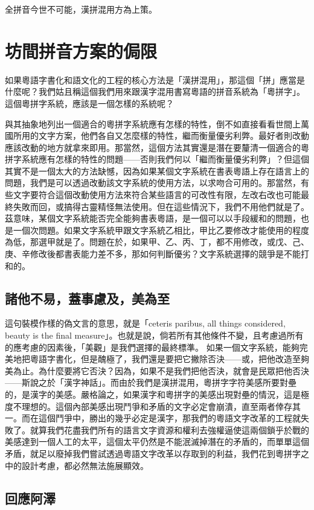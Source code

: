\documentclass[a5paper, 12pt, openany]{book} %
\begin{document}
全拼音今世不可能，漢拼混用方為上策。
 
\chapter{坊間拼音方案的侷限}

如果粵語字書化和語文化的工程的核心方法是「漢拼混用」，那這個「拼」應當是什麼呢？我們姑且稱這個我們用來跟漢字混用書寫粵語的拼音系統為「粵拼字」。這個粵拼字系統，應該是一個怎樣的系統呢？

與其抽象地列出一個適合的粵拼字系統應有怎樣的特性，倒不如直接看看世間上萬國所用的文字方案，他們各自又怎麼樣的特性，繼而衡量優劣利弊。最好者則改動應該改動的地方就拿來即用。那當然，這個方法其實還是潛在要釐清一個適合的粵拼字系統應有怎樣的特性的問題——否則我們何以「繼而衡量優劣利弊」？但這個其實不是一個太大的方法缺憾，因為如果某個文字系統在書表粵語上存在語言上的問題，我們是可以透過改動該文字系統的使用方法，以求吻合可用的。那當然，有些文字要符合這個改動使用方法來符合某些語言的可改性有限，左改右改也可能最終失敗而回，或搞得古靈精怪無法使用。但在這些情況下，我們不用他們就是了。茲意味，某個文字系統能否完全能夠書表粵語，是一個可以以手段緩和的問題，也是一個次問題。如果文字系統甲跟文字系統乙相比，甲比乙要修改才能使用的程度為低，那選甲就是了。問題在於，如果甲、乙、丙、丁，都不用修改，或戊、己、庚、辛修改後都書表能力差不多，那如何判斷優劣？文字系統選擇的競爭是不能打和的。

\section{諸他不易，蓋事慮及，美為至}

這句裝模作樣的偽文言的意思，就是「ceteris paribus, all things considered, beauty is the final measure」。也就是說，倘若所有其他條件不變，且考慮過所有的應考慮的因素後，「美觀」是我們選擇的最終標準。  如果一個文字系統，能夠完美地把粵語字書化，但是醜極了，我們還是要把它撇除否決——或，把他改造至夠美為止。為什麼要將它否決？因為，如果不是我們把他否決，就會是民眾把他否決——斯說之於「漢字神話」。而由於我們是漢拼混用，粵拼字字符美感所要對壘的，是漢字的美感。嚴格論之，如果漢字和粵拼字的美感出現對壘的情況，這是極度不理想的。這個內部美感出現鬥爭和矛盾的文字必定會崩潰，直至兩者倖存其一。而在這個鬥爭中，勝出的幾乎必定是漢字，那我們的粵語文字改革的工程就失敗了。就算我們花盡我們所有的語言文字資源和權利去強權逼使這兩個鎖乎於戰的美感達到一個人工的太平，這個太平仍然是不能泯滅掉潛在的矛盾的，而單單這個矛盾，就足以廢掉我們嘗試透過粵語文字改革以存取到的利益，我們花到粵拼字之中的設計考慮，都必然無法施展顯效。
\section{回應阿澤}
\end{document}
